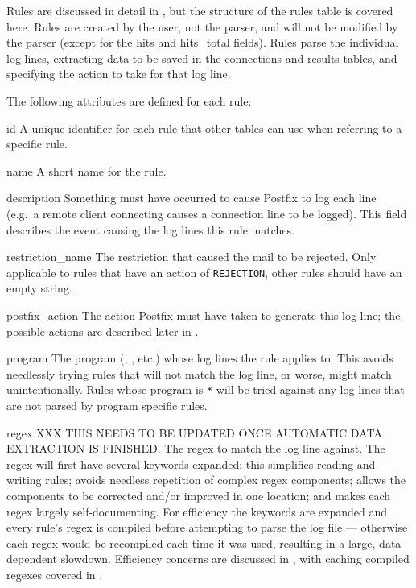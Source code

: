 \label{rule attributes}

Rules are discussed in detail in , but the structure of
the rules table is covered here.  Rules are created by the user, not the
parser, and will not be modified by the parser (except for the hits and
hits\_total fields).  Rules parse the individual log lines, extracting data
to be saved in the connections and results tables, and specifying the
action to take for that log line.

The following attributes are defined for each rule:

\begin{eqlist}

    \item [id] A unique identifier for each rule that other tables can use
        when referring to a specific rule.

    \item [name] A short name for the rule.

    \item [description] Something must have occurred to cause Postfix to
        log each line (e.g.\ a remote client connecting causes a connection
        line to be logged).  This field describes the event causing the log
        lines this rule matches.

    \item [restriction\_name] The restriction that caused the mail to be
        rejected.  Only applicable to rules that have an action of
        \texttt{REJECTION}, other rules should have an empty string.

    \item [postfix\_action] The action Postfix must have taken to generate
        this log line; the possible actions are described later in
        .

    \item [program] The program (, , etc.) whose
        log lines the rule applies to.  This avoids needlessly trying rules
        that will not match the log line, or worse, might match
        unintentionally.  Rules whose program is \texttt{*} will be tried
        against any log lines that are not parsed by program specific
        rules.

    \item [regex] XXX THIS NEEDS TO BE UPDATED ONCE AUTOMATIC DATA
        EXTRACTION IS FINISHED\@.  The regex to match the log line
        against.  The regex will first have several keywords expanded:
        this simplifies reading and writing rules; avoids needless
        repetition of complex regex components; allows the components to
        be corrected and/or improved in one location; and makes each
        regex largely self-documenting.  For efficiency the keywords are
        expanded and every rule's regex is compiled before attempting to
        parse the log file --- otherwise each regex would be recompiled
        each time it was used, resulting in a large, data dependent
        slowdown.  Efficiency concerns are discussed in , with caching compiled regexes covered in
        .


\end{eqlist}
